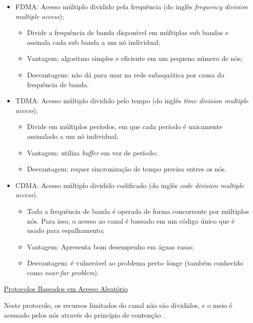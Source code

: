 \begin{itemize}
	\item FDMA: Acesso múltiplo dividido pela frequência (do inglês \textit{frequency division multiple access});
	\begin{itemize}
		\item Divide a frequência de banda disponível em múltiplas sub bandas e assinala cada sub banda a um nó individual;
		\item Vantagem: algoritmo simples e eficiente em um pequeno número de nós;
		\item Desvantagens: não dá para usar na rede subaquática por causa da frequência de banda.
	\end{itemize}
	\item TDMA: Acesso múltiplo dividido pelo tempo (do inglês \textit{time division multiple access});
	\begin{itemize}
		\item Divide em múltiplos períodos, em que cada período é unicamente assinalado a um nó individual;
		\item Vantagem: utiliza \textit{buffer} em vez de período;
		\item Desvantagem: requer sincronização de tempo precisa entres os nós.
	\end{itemize}
	\item CDMA: Acesso múltiplo dividido codificado (do inglês \textit{code division multiple access}).
	\begin{itemize}
		\item Toda a frequência de banda é operada de forma concorrente por múltiplos nós. Para isso, o acesso ao canal é baseado em um código único que é usado para espalhamento;
		\item Vantagem: Apresenta bom desempenho em águas rasas;
		\item Desvantagem: é vulnerável ao problema perto–longe (também conhecido como \textit{near-far problem}).
	\end{itemize}
\end{itemize}

\underline{Protocolos Baseados em Acesso Aleatório}

Neste protocolo, os recursos limitados do canal não são divididos, e o meio é acessado pelos nós através do princípio de contenção \cite{vieira2010redes}.

